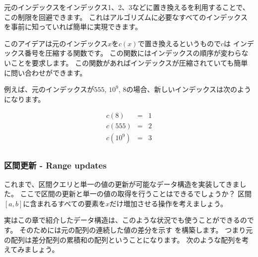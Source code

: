 
元のインデックスをインデックス1、2、3などに置き換えるを利用することで、
この制限を回避できます。
これはアルゴリズムに必要なすべてのインデックスを事前に知っていれば簡単に実現できます。

このアイデアは元のインデックス$x$を$c(x)$で置き換えるというもので$c$は インデックス番号を圧縮する関数です。
この関数にはインデックスの順序が変わらないことを要求します。
この関数があればインデックスが圧縮されていても簡単に問い合わせができます。

例えば、元のインデックスが$555$, $10^9$, $8$の場合、新しいインデックスは次のようになります。

\[
\begin{array}{lcl}
c(8) & = & 1 \\
c(555) & = & 2 \\
c(10^9) & = & 3 \\
\end{array}
\]

\subsubsection{区間更新 - Range updates}

これまで、区間クエリと単一の値の更新が可能なデータ構造を実装してきました。
ここで区間の更新と単一の値の取得を行うことはできるでしょうか？
区間$[a, b]$に含まれるすべての要素を$x$だけ増加させる操作を考えましょう。


実はこの章で紹介したデータ構造は、このような状況でも使うことができるのです。
そのためには元の配列の連続した値の差分を示す
を構築します。
つまり元の配列は差分配列の累積和の配列ということになります。
次のような配列を考えてみましょう。

\begin{center}
\end{center}

